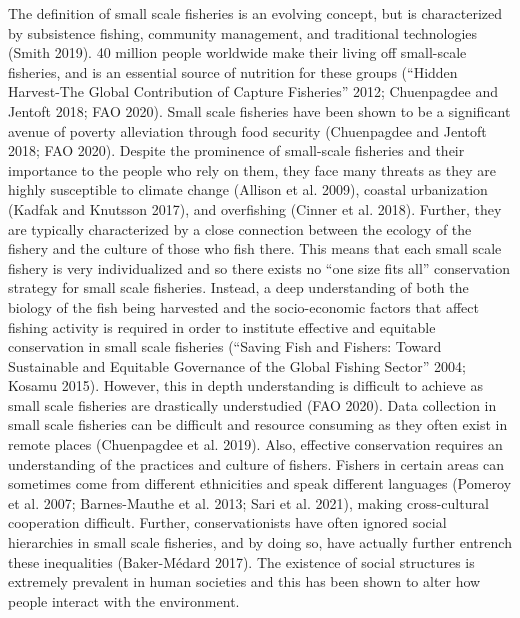 \documentclass[
]{article}
\begin{document}
The definition of small scale fisheries is an evolving concept, but is characterized by subsistence fishing, community management, and traditional technologies (Smith 2019). 40 million people worldwide make their living off small-scale fisheries, and is an essential source of nutrition for these groups ({``Hidden {Harvest}-{The} {Global} {Contribution} of {Capture} {Fisheries}''} 2012; Chuenpagdee and Jentoft 2018; FAO 2020). Small scale fisheries have been shown to be a significant avenue of poverty alleviation through food security (Chuenpagdee and Jentoft 2018; FAO 2020). Despite the prominence of small-scale fisheries and their importance to the people who rely on them, they face many threats as they are highly susceptible to climate change (Allison et al. 2009), coastal urbanization (Kadfak and Knutsson 2017), and overfishing (Cinner et al. 2018). Further, they are typically characterized by a close connection between the ecology of the fishery and the culture of those who fish there. This means that each small scale fishery is very individualized and so there exists no ``one size fits all'' conservation strategy for small scale fisheries. Instead, a deep understanding of both the biology of the fish being harvested and the socio-economic factors that affect fishing activity is required in order to institute effective and equitable conservation in small scale fisheries ({``Saving {Fish} and {Fishers}: {Toward} {Sustainable} and {Equitable} {Governance} of the {Global} {Fishing} {Sector}''} 2004; Kosamu 2015).
However, this in depth understanding is difficult to achieve as small scale fisheries are drastically understudied (FAO 2020). Data collection in small scale fisheries can be difficult and resource consuming as they often exist in remote places (Chuenpagdee et al. 2019). Also, effective conservation requires an understanding of the practices and culture of fishers. Fishers in certain areas can sometimes come from different ethnicities and speak different languages (Pomeroy et al. 2007; Barnes-Mauthe et al. 2013; Sari et al. 2021), making cross-cultural cooperation difficult. Further, conservationists have often ignored social hierarchies in small scale fisheries, and by doing so, have actually further entrench these inequalities (Baker-Médard 2017). The existence of social structures is extremely prevalent in human societies and this has been shown to alter how people interact with the environment.
\end{document}
